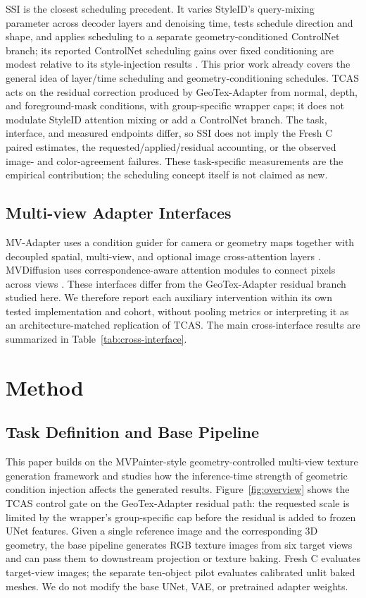 \documentclass[times,twocolumn,final]{elsarticle}
\begin{document}
SSI is the closest scheduling precedent. It varies StyleID's query-mixing parameter across decoder layers and denoising time, tests schedule direction and shape, and applies scheduling to a separate geometry-conditioned ControlNet branch; its reported ControlNet scheduling gains over fixed conditioning are modest relative to its style-injection results \cite{kulkarni2026ssi}. This prior work already covers the general idea of layer/time scheduling and geometry-conditioning schedules. TCAS acts on the residual correction produced by GeoTex-Adapter from normal, depth, and foreground-mask conditions, with group-specific wrapper caps; it does not modulate StyleID attention mixing or add a ControlNet branch. The task, interface, and measured endpoints differ, so SSI does not imply the Fresh C paired estimates, the requested/applied/residual accounting, or the observed image- and color-agreement failures. These task-specific measurements are the empirical contribution; the scheduling concept itself is not claimed as new.

\subsection{Multi-view Adapter Interfaces}
\label{subsec:mvinterfaces}

MV-Adapter uses a condition guider for camera or geometry maps together with decoupled spatial, multi-view, and optional image cross-attention layers \cite{huang2024mvadapter}. MVDiffusion uses correspondence-aware attention modules to connect pixels across views \cite{tang2023mvdiffusion}. These interfaces differ from the GeoTex-Adapter residual branch studied here. We therefore report each auxiliary intervention within its own tested implementation and cohort, without pooling metrics or interpreting it as an architecture-matched replication of TCAS. The main cross-interface results are summarized in Table~\ref{tab:cross-interface}.

\section{Method}
\label{sec:method}

\subsection{Task Definition and Base Pipeline}
\label{subsec:task}

This paper builds on the MVPainter-style geometry-controlled multi-view texture generation framework \cite{shao2025mvpainter} and studies how the inference-time strength of geometric condition injection affects the generated results. Figure~\ref{fig:overview} shows the TCAS control gate on the GeoTex-Adapter residual path: the requested scale is limited by the wrapper's group-specific cap before the residual is added to frozen UNet features. Given a single reference image and the corresponding 3D geometry, the base pipeline generates RGB texture images from six target views and can pass them to downstream projection or texture baking. Fresh C evaluates target-view images; the separate ten-object pilot evaluates calibrated unlit baked meshes. We do not modify the base UNet, VAE, or pretrained adapter weights.
\end{document}
